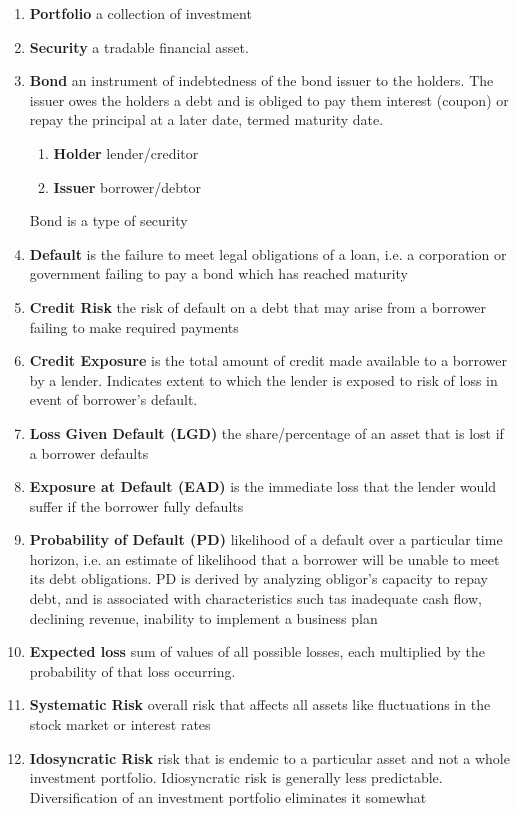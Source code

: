 \documentclass[11pt]{article}
\begin{document}
\begin{enumerate}
    \item \textbf{Portfolio} a collection of investment
    \item \textbf{Security} a tradable financial asset.
    \item \textbf{Bond} an instrument of indebtedness of the bond issuer to the holders. The issuer owes the holders a debt and is obliged to pay them interest (coupon) or repay the principal at a later date, termed maturity date.
    \begin{enumerate}
        \item \textbf{Holder} lender/creditor 
        \item \textbf{Issuer} borrower/debtor
    \end{enumerate}
    Bond is a type of security
    \item \textbf{Default} is the failure to meet legal obligations of a loan, i.e. a corporation or government failing to pay a bond which has reached maturity
    \item \textbf{Credit Risk} the risk of default on a debt that may arise from a borrower failing to make required payments 
    \item \textbf{Credit Exposure} is the total amount of credit made available to a borrower by a lender. Indicates extent to which the lender is exposed to risk of loss in event of borrower's default. 
    \item \textbf{Loss Given Default (LGD)} the share/percentage of an asset that is lost if a borrower defaults
    \item \textbf{Exposure at Default (EAD)} is the immediate loss that the lender would suffer if the borrower fully defaults
    \item \textbf{Probability of Default (PD)} likelihood of a default over a particular time horizon, i.e. an estimate of likelihood that a borrower will be unable to meet its debt obligations. PD is derived by analyzing obligor's capacity to repay debt, and is associated with characteristics such tas inadequate cash flow, declining revenue, inability to implement a business plan
    \item \textbf{Expected loss} sum of values of all possible losses, each multiplied by the probability of that loss occurring.
    \item \textbf{Systematic Risk} overall risk that affects all assets like fluctuations in the stock market or interest rates
    \item \textbf{Idosyncratic Risk} risk that is endemic to a particular asset and not a whole investment portfolio. Idiosyncratic risk is generally less predictable. Diversification of an investment portfolio eliminates it somewhat
\end{enumerate}
\end{document}

